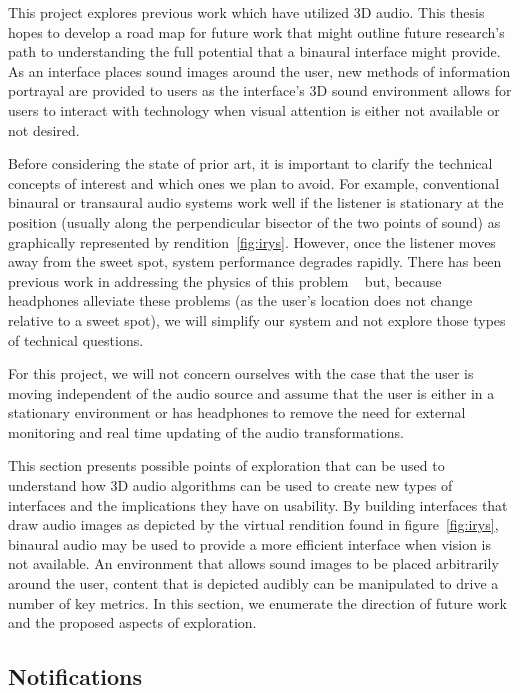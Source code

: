 This project explores previous work which have utilized 3D audio.  This thesis
hopes to develop a road map for future work that might outline future research's
path to understanding the full potential that a binaural interface might
provide.  As an interface places sound images around the user, new methods of
information  portrayal are provided to users as the interface's 3D sound
environment allows for users to interact with technology when visual attention
is either not  available or not desired.

Before considering the state of prior art, it is important to clarify the
technical concepts of interest and which ones we plan to avoid. For example,
conventional binaural or transaural audio systems work well if the listener is
stationary at the position (usually along the perpendicular bisector of the two
points of sound) as  graphically represented by rendition~\ref{fig:irys}.
However, once the listener moves away from the sweet spot, system performance
degrades rapidly. There has been previous work in addressing the physics of this
problem ~\cite{song2010personal} but, because headphones alleviate these
problems (as the user's location does not change relative to a sweet spot), we
will simplify our system and not explore those types of technical questions.

For this project, we will not concern ourselves with the case that the user is
moving independent of the audio source and assume that the user is either in a
stationary environment or has headphones to remove the need for external
monitoring and real time updating of the audio transformations.

This section presents possible points of exploration that can be used to
understand how 3D audio algorithms can be used to create new types of interfaces
and the  implications they have on usability. By building interfaces that draw
audio images  as depicted by the virtual rendition found in
figure~\ref{fig:irys}, binaural audio may be used to provide a more efficient
interface when vision is not available.  An environment that allows sound images
to be placed arbitrarily around the user, content that is depicted audibly can
be manipulated to drive a number of key  metrics. In this section, we enumerate
the direction of future work and the  proposed aspects of exploration.

\subsection{                  Notifications                                  }

